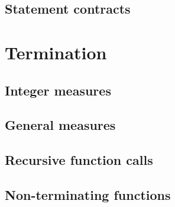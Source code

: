 \subsection{Statement contracts}
\label{sec:statement_contract}


\section{Termination}
\label{sec:termination}


\subsection{Integer measures}
\label{sec:integermeasures}


\subsection{General measures}
\label{sec:generalmeasures}


\subsection{Recursive function calls}


\subsection{Non-terminating functions}
\label{sec:non-term-funct}

\absent


